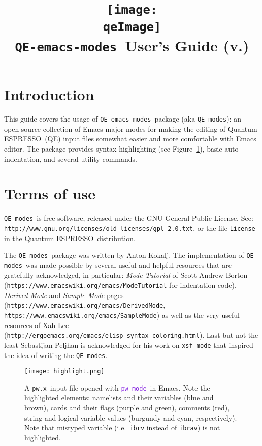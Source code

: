 \documentclass[12pt,a4paper]{article}
\def\qe{{\sc Quantum ESPRESSO}}
\def\pwx{\texttt{pw.x}}
\def\QEmodes{\texttt{QE-modes}}
\def\QEemodes{\texttt{QE-emacs-modes}}
\def\efn#1{\textcolor{BlueViolet}{\texttt{#1}}}
\def\pwmode{\efn{pw-mode}}
\begin{document}
 
\author{}
\date{}

\def\qeImage{../../../Doc/quantum_espresso.png}

\title{
  \texttt{[image: \\qeImage]} \\
  \Huge \QEemodes\ User's Guide (v.\version) 
}

\maketitle

\tableofcontents

\section{Introduction}

This guide covers the usage of \QEemodes\ package (aka \QEmodes): an
open-source collection of Emacs major-modes for making the editing of
\qe\ (QE) input files somewhat easier and more comfortable with Emacs
editor. The package provides syntax highlighting (see
Figure~\ref{fig:example}), basic auto-indentation, and several utility
commands.

\section{Terms of use}

\QEmodes\ is free software, released under the
GNU General Public License. See:
\texttt{http://www.gnu.org/licenses/old-licenses/gpl-2.0.txt}, or the
file \texttt{License} in the \qe\ distribution.

The \QEmodes\ package was written by Anton Kokalj. The implementation
of \QEmodes\ was made possible by several useful and helpful resources
that are gratefully acknowledged, in particular: {\it Mode Tutorial}
of Scott Andrew Borton
(\texttt{https://www.emacswiki.org/emacs/ModeTutorial} for
indentation code), {\it Derived Mode} and {\it Sample Mode} pages
(\texttt{https://www.emacswiki.org/emacs/DerivedMode},
\texttt{https://www.emacswiki.org/emacs/SampleMode}) as well as the
very useful resources of Xah Lee
(\texttt{http://ergoemacs.org/emacs/elisp\_syntax\_coloring.html}). Last
but not the least Sebastijan Peljhan is acknowledged for his work on
\texttt{xsf-mode} that inspired the idea of writing the \QEmodes.


\begin{figure}[htb]
  \centering
  \texttt{[image: highlight.png]}
  \caption{A \pwx\ input file opened with \pwmode\ in Emacs. Note the
    highlighted elements: namelists and their variables (blue and
    brown), cards and their flags (purple and green), comments (red),
    string and logical variable values (burgundy and cyan,
    respectively). Note that mistyped variable (i.e.\ \texttt{ibrv}
    instead of \texttt{ibrav}) is not highlighted.}
  \label{fig:example}
\end{figure}
    
\end{document}

